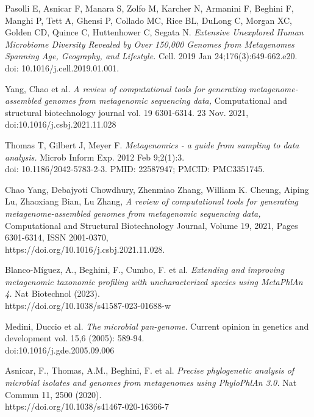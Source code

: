 \documentclass[a4paper,titlepage, oneside]{book}
\begin{document}
\begin{thebibliography}{}

Pasolli E, Asnicar F, Manara S, Zolfo M, Karcher N, Armanini F, Beghini F, Manghi P, Tett A, Ghensi P, Collado MC, Rice BL, DuLong C, Morgan XC, Golden CD, Quince C, Huttenhower C, Segata N. \emph{Extensive Unexplored Human Microbiome Diversity Revealed by Over 150,000 Genomes from Metagenomes Spanning Age, Geography, and Lifestyle.} Cell. 2019 Jan 24;176(3):649-662.e20. \\doi: 10.1016/j.cell.2019.01.001.

Yang, Chao et al. \emph{A review of computational tools for generating metagenome-assembled genomes from metagenomic sequencing data,} Computational and structural biotechnology journal vol. 19 6301-6314. 23 Nov. 2021, \\doi:10.1016/j.csbj.2021.11.028

Thomas T, Gilbert J, Meyer F.
\emph{Metagenomics - a guide from sampling to data analysis.} Microb Inform Exp. 2012 Feb 9;2(1):3. \\doi: 10.1186/2042-5783-2-3. PMID: 22587947; PMCID: PMC3351745.






Chao Yang, Debajyoti Chowdhury, Zhenmiao Zhang, William K. Cheung, Aiping Lu, Zhaoxiang Bian, Lu Zhang,
\emph{A review of computational tools for generating metagenome-assembled genomes from metagenomic sequencing data,} Computational and Structural Biotechnology Journal, Volume 19, 2021, Pages 6301-6314, ISSN 2001-0370, \\https://doi.org/10.1016/j.csbj.2021.11.028.


Blanco-Míguez, A., Beghini, F., Cumbo, F. et al. \emph{Extending and improving metagenomic taxonomic profiling with uncharacterized species using MetaPhlAn 4.} Nat Biotechnol (2023). \\https://doi.org/10.1038/s41587-023-01688-w


Medini, Duccio et al. \emph{The microbial pan-genome.} Current opinion in genetics and development vol. 15,6 (2005): 589-94. \\doi:10.1016/j.gde.2005.09.006


Asnicar, F., Thomas, A.M., Beghini, F. et al.
\emph{Precise phylogenetic analysis of microbial isolates and genomes from metagenomes using PhyloPhlAn 3.0.} Nat Commun 11, 2500 (2020).\\ https://doi.org/10.1038/s41467-020-16366-7


\end{thebibliography}
\end{document}
